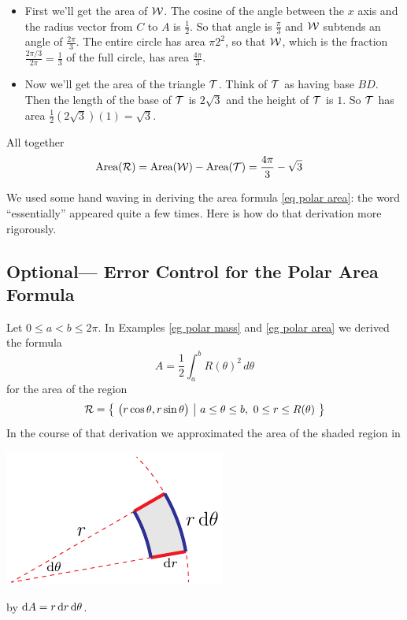 \begin{eg}
\begin{itemize}
\item
First we'll get the area of $\mathcal{W}$. The cosine of the angle between the
$x$ axis and the radius vector from $C$ to $A$ is $\frac{1}{2}$. So that
angle is $\frac{\pi}{3}$ and $\mathcal{W}$ subtends an angle of $\frac{2\pi}{3}$.
The entire circle has area $\pi 2^2$, so that $\mathcal{W}$, which is the fraction
$\frac{2\pi/3}{2\pi}=\frac{1}{3}$ of the full circle, has area
$\frac{4\pi}{3}$.

\item
Now we'll get the area of the triangle $\mathcal{T}$. Think of $\mathcal{T}$ as having
base $BD$. Then the length of the base of $\mathcal{T}$ is $2\sqrt{3}$
and the height of $\mathcal{T}$ is $1$. So $\mathcal{T}$ has area $\frac{1}{2}(2\sqrt{3})(1)
=\sqrt{3}$.
\end{itemize}
All together
\begin{align*}
\text{Area}(\mathcal{R}) 
&=\text{Area}(\mathcal{W})-\text{Area}(\mathcal{T})
=\frac{4\pi}{3}-\sqrt{3}
\end{align*}

\end{eg}

We used some hand waving in deriving the area formula \eqref{eq polar area}:
the word ``essentially'' appeared quite a few times. Here is
how do that derivation more rigorously.


\subsection{Optional--- Error Control for the Polar Area Formula} \label{sec integral error}

Let $0\le a<b\le 2\pi$. In Examples \ref{eg polar mass}
and \ref{eg polar area} we derived the formula
\begin{equation*}
A=\frac{1}{2}\int_a^b R(\theta)^2\,d\theta
\end{equation*}
for the area of the region
\begin{equation*}
\mathcal{R}=\big\{ \ \big(r\cos\theta,r\sin\theta\big)\ \big|\ a\le\theta\le b,\ 0\le r\le R(\theta)\ \big\}
\end{equation*}
In the course of that derivation we approximated the area of the
shaded region in 
\begin{efig}
\begin{center}
    \includegraphics{polarA.pdf}
\end{center}
\end{efig}
by $\mathrm{d}A = r\,\mathrm{d}r\,\mathrm{d}\theta$.



